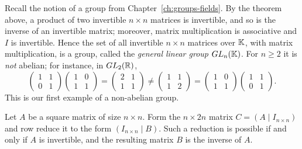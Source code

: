\begin{example}
Recall the notion of a group from Chapter~\ref{ch:groups-fields}. By the theorem above, a product of two
invertible $n\times n$ matrices is invertible, and so is the inverse of an invertible matrix; moreover,
matrix multiplication is associative and $I$ is invertible. Hence the set of all invertible $n\times n$
matrices over $\mathbb{K}$, with matrix multiplication, is a group, called the \emph{general linear group}
$GL_n(\mathbb{K})$. For $n\geq 2$ it is \emph{not} abelian; for instance, in $GL_2(\mathbb{R})$,
\[
\begin{pmatrix} 1 & 1\\ 0 & 1\end{pmatrix}
\begin{pmatrix} 1 & 0\\ 1 & 1\end{pmatrix}
=\begin{pmatrix} 2 & 1\\ 1 & 1\end{pmatrix}
\neq
\begin{pmatrix} 1 & 1\\ 1 & 2\end{pmatrix}
=\begin{pmatrix} 1 & 0\\ 1 & 1\end{pmatrix}
\begin{pmatrix} 1 & 1\\ 0 & 1\end{pmatrix}.
\]
This is our first example of a non-abelian group.
\end{example}

\begin{fact}
Let $A$ be a square matrix of size $n\times n$. Form the $n\times 2n$ matrix $C=(A\mid I_{n\times n})$ and row reduce
it to the form $(I_{n\times n}\mid B)$. Such a reduction is possible if and only if $A$ is invertible, and
the resulting matrix $B$ is the inverse of $A$.
\end{fact}

